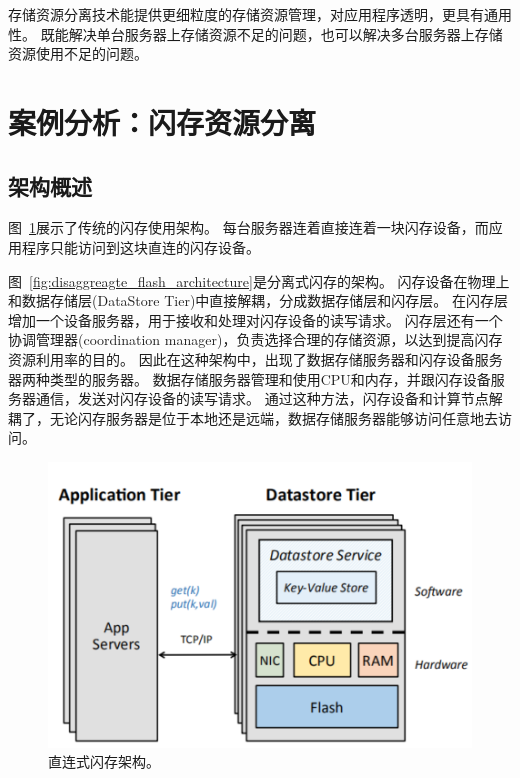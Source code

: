 存储资源分离技术能提供更细粒度的存储资源管理，对应用程序透明，更具有通用性。
既能解决单台服务器上存储资源不足的问题，也可以解决多台服务器上存储资源使用不足的问题。


\section{案例分析：闪存资源分离}

\subsection{架构概述}

图~\ref{fig:direct_flash_architecture}展示了传统的闪存使用架构。
每台服务器连着直接连着一块闪存设备，而应用程序只能访问到这块直连的闪存设备。

图~\ref{fig:disaggreagte_flash_architecture}是分离式闪存的架构。
闪存设备在物理上和数据存储层(DataStore Tier)中直接解耦，分成数据存储层和闪存层。
在闪存层增加一个设备服务器，用于接收和处理对闪存设备的读写请求。
闪存层还有一个协调管理器(coordination manager)，负责选择合理的存储资源，以达到提高闪存资源利用率的目的。
因此在这种架构中，出现了数据存储服务器和闪存设备服务器两种类型的服务器。
数据存储服务器管理和使用CPU和内存，并跟闪存设备服务器通信，发送对闪存设备的读写请求。
通过这种方法，闪存设备和计算节点解耦了，无论闪存服务器是位于本地还是远端，数据存储服务器能够访问任意地去访问。

\begin{figure}
\centering
\includegraphics[scale=0.8]{Figures/storage/direct_flash_architecture.jpg}
\decoRule
\caption{直连式闪存架构。}
\label{fig:direct_flash_architecture}
\end{figure}

